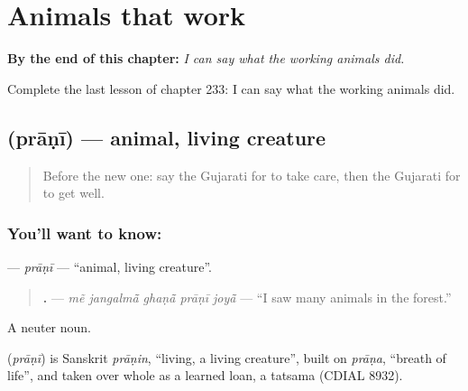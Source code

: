 
\chapter{Animals that work}
\label{ch:gu-animals-that-work}

\begin{chapteropening}
\textbf{By the end of this chapter:} \emph{I can say what the working animals did.}

Complete the last lesson of chapter 233: I can say what the working animals did.
\end{chapteropening}

\section[\texorpdfstring{\gu{પ્રાણી} (prāṇī)}{પ્રાણી (prāṇī)}]{ (prāṇī) — animal, living creature}

\label{lesson:GU-C233-prani}



\begin{quote}
Before the new one: say the Gujarati for to take care, then the Gujarati for to get well.
\end{quote}

\subsection*{You'll want to know: }
\textbf{} — \emph{prāṇī} — \textquotedblleft{}animal, living creature\textquotedblright{}.

\begin{quote}
\textbf{    .} — \emph{mẽ jangalmā̃ ghaṇā̃ prāṇī joyā̃} — \textquotedblleft{}I saw many animals in the forest.\textquotedblright{}
\end{quote}

A neuter noun.

\begin{cousinweb}
\textbf{} (\emph{prāṇī}) is Sanskrit \emph{prāṇin}, \textquotedblleft{}living, a living creature\textquotedblright{}, built on \emph{prāṇa}, \textquotedblleft{}breath of life\textquotedblright{}, and taken over whole as a learned loan, a tatsama (CDIAL 8932).
\end{cousinweb}

